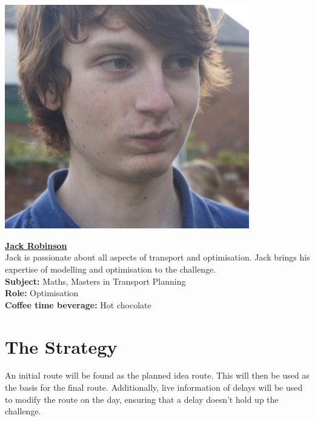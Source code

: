 \documentclass[a4paper,11pt]{article}  %
\begin{document}
\noindent \begin{minipage}{0.4\textwidth}
  \includegraphics[width=0.8\textwidth]{JackProfile.jpg}
\end{minipage}
\hfill
\begin{minipage}{0.6\textwidth}
  {\large \textbf{\underline{Jack Robinson}}}\\

  Jack is passionate about all aspects of transport and
  optimisation. Jack brings his expertise of modelling and
  optimisation to the challenge.\\

  \textbf{Subject:} Maths, Masters in Transport Planning\\
  \textbf{Role:} Optimisation\\
  \textbf{Coffee time beverage:} Hot chocolate
\end{minipage}

\bigskip

\section*{The Strategy}

An initial route will be found as the planned idea route. This will
then be used as the basis for the final route. Additionally, live
information of delays will be used to modify the route on the day,
ensuring that a delay doesn't hold up the challenge.
\end{document}
